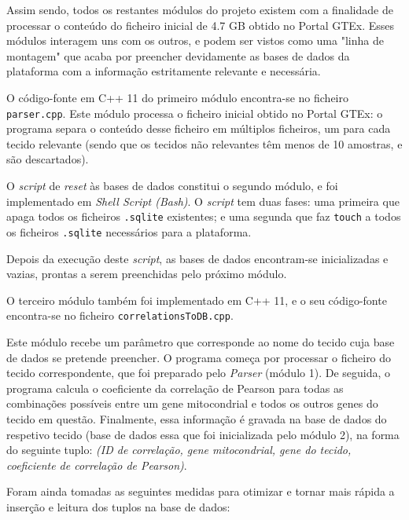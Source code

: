 Assim sendo, todos os restantes módulos do projeto existem com a finalidade de processar o conteúdo do ficheiro inicial de 4.7 GB obtido no Portal GTEx. Esses módulos interagem uns com os outros, e podem ser vistos como uma "linha de montagem" que acaba por preencher devidamente as bases de dados da plataforma com a informação estritamente relevante e necessária.

\bigskip

O código-fonte em C++ 11 do primeiro módulo encontra-se no ficheiro \texttt{parser.cpp}. Este módulo processa o ficheiro inicial obtido no Portal GTEx: o programa separa o conteúdo desse ficheiro em múltiplos ficheiros, um para cada tecido relevante (sendo que os tecidos não relevantes têm menos de 10 amostras, e são descartados).

\bigskip

O \textit{script} de \textit{reset} às bases de dados constitui o segundo módulo, e foi implementado em \textit{Shell Script (Bash)}. O \textit{script} tem duas fases: uma primeira que apaga todos os ficheiros \texttt{.sqlite} existentes; e uma segunda que faz \texttt{touch} a todos os ficheiros \texttt{.sqlite} necessários para a plataforma.

Depois da execução deste \textit{script}, as bases de dados encontram-se inicializadas e vazias, prontas a serem preenchidas pelo próximo módulo.

\bigskip

O terceiro módulo também foi implementado em C++ 11, e o seu código-fonte encontra-se no ficheiro \texttt{correlationsToDB.cpp}.

Este módulo recebe um parâmetro que corresponde ao nome do tecido cuja base de dados se pretende preencher. O programa começa por processar o ficheiro do tecido correspondente, que foi preparado pelo \textit{Parser} (módulo 1). De seguida, o programa calcula o coeficiente da correlação de Pearson para todas as combinações possíveis entre um gene mitocondrial e todos os outros genes do tecido em questão. Finalmente, essa informação é gravada na base de dados do respetivo tecido (base de dados essa que foi inicializada pelo módulo 2), na forma do seguinte tuplo: \textit{(ID de correlação, gene mitocondrial, gene do tecido, coeficiente de correlação de Pearson)}.

Foram ainda tomadas as seguintes medidas para otimizar e tornar mais rápida a inserção e leitura dos tuplos na base de dados:


